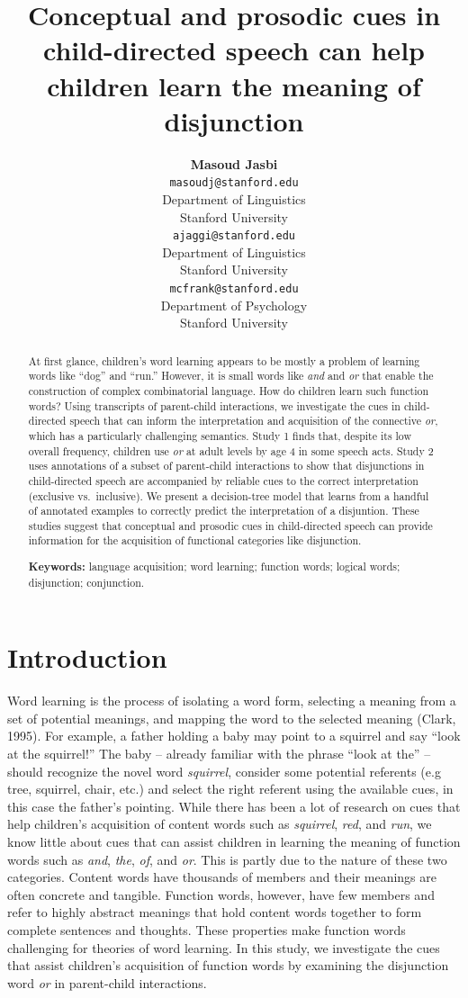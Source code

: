 \documentclass[10pt, letterpaper]{article}
\title{Conceptual and prosodic cues in child-directed speech can help children
learn the meaning of disjunction}
\author{{\large \bf Masoud Jasbi} \\ \texttt{masoudj@stanford.edu} \\ Department of Linguistics \\ Stanford University \And {\large \bf Akshay Jaggi} \\ \texttt{ajaggi@stanford.edu} \\ Department of Linguistics \\ Stanford University \And {\large \bf Michael C. Frank} \\ \texttt{mcfrank@stanford.edu} \\ Department of Psychology \\ Stanford University }
\begin{document}
\maketitle

\begin{abstract}
At first glance, children's word learning appears to be mostly a problem
of learning words like ``dog'' and ``run.'' However, it is small words
like \emph{and} and \emph{or} that enable the construction of complex
combinatorial language. How do children learn such function words? Using
transcripts of parent-child interactions, we investigate the cues in
child-directed speech that can inform the interpretation and acquisition
of the connective \emph{or}, which has a particularly challenging
semantics. Study 1 finds that, despite its low overall frequency,
children use \emph{or} at adult levels by age 4 in some speech acts.
Study 2 uses annotations of a subset of parent-child interactions to
show that disjunctions in child-directed speech are accompanied by
reliable cues to the correct interpretation (exclusive vs.~inclusive).
We present a decision-tree model that learns from a handful of annotated
examples to correctly predict the interpretation of a disjuntion. These
studies suggest that conceptual and prosodic cues in child-directed
speech can provide information for the acquisition of functional
categories like disjunction.

\textbf{Keywords:}
language acquisition; word learning; function words; logical words;
disjunction; conjunction.
\end{abstract}

\section{Introduction}\label{introduction}

Word learning is the process of isolating a word form, selecting a
meaning from a set of potential meanings, and mapping the word to the
selected meaning (Clark, 1995). For example, a father holding a baby may
point to a squirrel and say ``look at the squirrel!'' The baby --
already familiar with the phrase ``look at the'' -- should recognize the
novel word \emph{squirrel}, consider some potential referents (e.g tree,
squirrel, chair, etc.) and select the right referent using the available
cues, in this case the father's pointing. While there has been a lot of
research on cues that help children's acquisition of content words such
as \emph{squirrel}, \emph{red}, and \emph{run}, we know little about
cues that can assist children in learning the meaning of function words
such as \emph{and}, \emph{the}, \emph{of}, and \emph{or}. This is partly
due to the nature of these two categories. Content words have thousands
of members and their meanings are often concrete and tangible. Function
words, however, have few members and refer to highly abstract meanings
that hold content words together to form complete sentences and
thoughts. These properties make function words challenging for theories
of word learning. In this study, we investigate the cues that assist
children's acquisition of function words by examining the disjunction
word \emph{or} in parent-child interactions.
\end{document}
